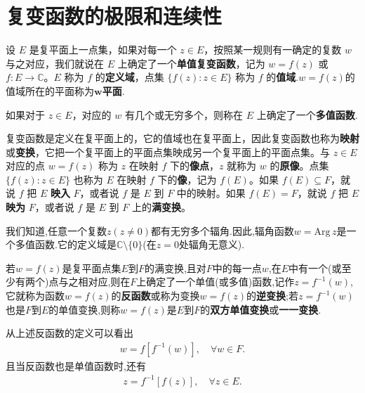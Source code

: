 \documentclass[../../main.tex]{subfiles}%
\begin{document}
\section{复变函数的极限和连续性}

\begin{definition}
设 $E$ 是复平面上一点集，如果对每一个 $z \in E$，按照某一规则有一确定的复数 $w$ 与之对应，我们就说在 $E$ 上确定了一个\textbf{单值复变函数}，记为 $w = f(z)$ 或 $f: E \to \mathbb{C}$。$E$ 称为 $f$ 的\textbf{定义域}，点集 $\{ f(z): z \in E\}$ 称为 $f$ 的\textbf{值域}.$w=f(z)$的值域所在的平面称为$\boldsymbol{w}$\textbf{平面}.

如果对于 $z \in E$，对应的 $w$ 有几个或无穷多个，则称在 $E$ 上确定了一个\textbf{多值函数}.

复变函数是定义在复平面上的，它的值域也在复平面上，因此复变函数也称为\textbf{映射}或\textbf{变换}，它把一个复平面上的平面点集映成另一个复平面上的平面点集。与 $z \in E$ 对应的点 $w = f(z)$ 称为 $z$ 在映射 $f$ 下的\textbf{像点}，$z$ 就称为 $w$ 的\textbf{原像}。点集 $\{ f(z): z \in E\}$ 也称为 $E$ 在映射 $f$ 下的\textbf{像}，记为 $f(E)$。如果 $f(E) \subseteq F$，就说 $f$ 把 $E$ \textbf{映入} $F$，或者说 $f$ 是 $E$ 到 $F$ 中的映射。如果 $f(E) = F$，就说 $f$ 把 $E$ \textbf{映为} $F$，或者说 $f$ 是 $E$ 到 $F$ 上的\textbf{满变换}。
\end{definition}
\begin{remark}
我们知道,任意一个复数$z(z \neq 0)$都有无穷多个辐角.因此,辐角函数$w = \mathrm{Arg}\, z$是一个多值函数.它的定义域是$\mathbb{C} \setminus \{0\}$(在$z=0$处辐角无意义).
\end{remark}

\begin{definition}
若$w=f(z)$是复平面点集$E$到$F$的满变换,且对$F$中的每一点$w$,在$E$中有一个(或至少有两个)点与之相对应,则在$F$上确定了一个单值(或多值)函数,记作$z=f^{-1}(w)$,它就称为函数$w=f(z)$的\textbf{反函数}或称为变换$w=f(z)$的\textbf{逆变换};若$z=f^{-1}(w)$也是$F$到$E$的单值变换,则称$w=f(z)$是$E$到$F$的\textbf{双方单值变换}或\textbf{一一变换}.
\end{definition}
\begin{remark}
从上述反函数的定义可以看出
\begin{align*}
w=f[f^{-1}(w)],\quad \forall w\in F.
\end{align*}
且当反函数也是单值函数时,还有
\begin{align*}
z=f^{-1}[f(z)],\quad \forall z\in E.
\end{align*}
\end{remark}
\end{document}
